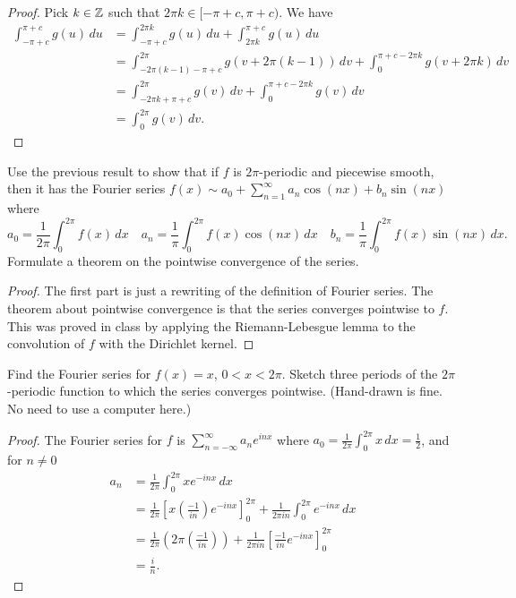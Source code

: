\documentclass{article}
\begin{document}
\begin{proof}
Pick $k \in \mathbb{Z}$ such that $2\pi k \in [-\pi + c, \pi + c)$.  We have 
\begin{align*}
\int_{-\pi+c}^{\pi + c} g(u) \, du & = \int_{-\pi + c}^{2\pi k} g(u) \, du +  \int_{2\pi k}^{\pi + c} g(u) \, du
\\ & = \int_{-2\pi (k-1) - \pi + c}^{2\pi} g(v + 2 \pi (k-1))  \, dv + \int_0^{\pi + c - 2 \pi k} g(v + 2 \pi k) \, dv
\\ & = \int_{-2\pi k + \pi + c}^{2\pi} g(v)  \, dv + \int_0^{\pi + c - 2 \pi k} g(v) \, dv
\\ &  = \int_0^{2\pi} g(v) \, dv.
\end{align*}
\end{proof}


 Use the previous result to show that if $f$ is $2 \pi$-periodic and piecewise smooth, then it has the Fourier series $f(x) \sim a_0 + \sum_{n=1}^\infty a_n \cos(nx) + b_n \sin(nx)$ where
$$ a_0 = \frac 1 {2\pi} \int_0^{2\pi} f(x) \, dx \quad a_n = \frac 1 \pi \int_0^{2\pi} f(x) \cos(nx) \, dx \quad b_n = \frac 1 \pi \int_0^{2\pi} f(x) \sin(nx) \, dx. $$
Formulate a theorem on the pointwise convergence of the series.

\begin{proof}
The first part is just a rewriting of the definition of Fourier series.  The theorem about pointwise convergence is that the series converges pointwise to $f$. This was proved in class by applying the Riemann-Lebesgue lemma to the convolution of $f$ with the Dirichlet kernel.
\end{proof}


 Find the Fourier series for $f(x)=x$, $0<x<2 \pi$. Sketch three periods of the $2\pi$-periodic function to which the series converges pointwise. (Hand-drawn is fine. No need to use a computer here.)

\begin{proof}
The Fourier series for $f$ is $\sum_{n = -\infty}^{\infty} a_n e^{inx}$ where $a_0 = \frac 1 {2\pi} \int_{0}^{2 \pi} x \,dx = \frac 1 2$, and for $n \neq 0$
\begin{align*}
a_n & = \frac 1 {2 \pi} \int_0^{2\pi} x e^{-inx} \, dx
\\ & = \frac 1 {2 \pi} \left[ x \left( \frac{-1}{in} \right) e^{-inx} \right]_0^{2\pi} + \frac 1 {2\pi in} \int_0^{2\pi} e^{-inx} \, dx
\\ & = \frac 1 {2 \pi} \left( 2\pi \left( \frac{-1}{in} \right)  \right) + \frac 1 {2\pi in} \left[ \frac {-1}{in} e^{-inx} \right]_0^{2\pi}
\\ & = \frac i n.
\end{align*}
\end{proof}
\end{document}

